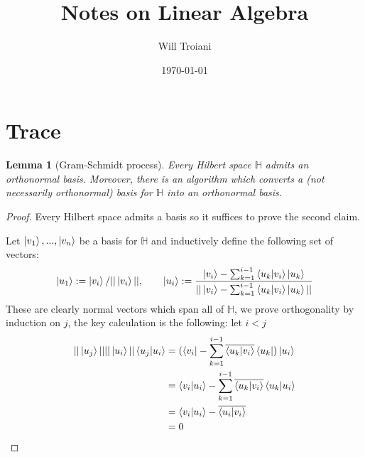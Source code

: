 \documentclass[12pt]{article}
\title{Notes on Linear Algebra}
\author{Will Troiani}
\date{\today}
\theoremstyle{plain}
\newtheorem{lemma}[thm]{Lemma}
\theoremstyle{definition}
\newcommand{\bb}[1]{\mathbb{#1}}
\begin{document}
\maketitle

\section{Trace}

\begin{lemma}[Gram-Schmidt process]\label{lem:gram_schmidt}
Every Hilbert space $\bb{H}$ admits an orthonormal basis. Moreover, there is an algorithm which converts a (not necessarily orthonormal) basis for $\bb{H}$ into an orthonormal basis.
\end{lemma}
\begin{proof}
Every Hilbert space admits a basis so it suffices to prove the second claim.

Let $\ket{v_1},...,\ket{v_n}$ be a basis for $\bb{H}$ and inductively define the following set of vectors:
\begin{equation}
\ket{u_1} := \ket{v_i}/||\ket{v_i}||,\qquad
\ket{u_i} := \frac{\ket{v_i} - \sum_{k = 1}^{i-1}\bra{u_k}\ket{v_i}\ket{u_k}}{||\ket{v_i} - \sum_{k = 1}^{i-1}\bra{u_k}\ket{v_i}\ket{u_k}||}
\end{equation}
These are clearly normal vectors which span all of $\bb{H}$, we prove orthogonality by induction on $j$, the key calculation is the following: let $i < j$
\begin{align*}
||\ket{u_j}|| ||\ket{u_i}||\bra{u_j}\ket{u_i} &= (\bra{v_i} - \sum_{k = 1}^{i-1}\overline{\bra{u_k}\ket{v_i}}\bra{u_k})\ket{u_i}\\
&= \bra{v_i}\ket{u_i} - \sum_{k = 1}^{i-1}\overline{\bra{u_k}\ket{v_i}}\bra{u_k}\ket{u_i}\\
&= \bra{v_i}\ket{u_i} - \overline{\bra{u_i}\ket{v_i}}\\
&= 0
\end{align*}
\end{proof}
\end{document}
